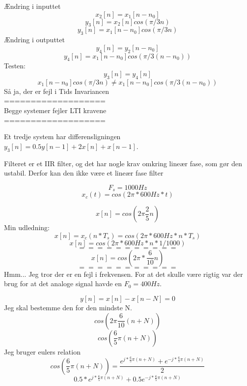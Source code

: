 \begin{rubrik}[Eksamenssæt2022]
\begin{eksamensOpgave}
\begin{UnderOpgave}
            Ændring i inputtet
            \[x_2[n] = x_1[n - n_0]\]
            \[y_3[n] = x_2[n]cos(\pi/3 n)\]
            \[y_3[n] = x_1[n - n_0]cos(\pi/3 n)\]
            Ændring i outputtet
            \[y_4[n] = y_2[n - n_0]\]
            \[y_4[n] = x_1[n - n_0]cos(\pi/3 (n - n_0))\]
            Testen: 
            \[y_3[n] = y_4[n]\]
            \[x_1[n - n_0]cos(\pi/3 n) \neq x_1[n - n_0]cos(\pi/3 (n - n_0))\]
            Så ja, der er fejl i Tids Invariancen\\
            ===================\\
            Begge systemer fejler LTI kravene\\
            ===================\\
        \end{UnderOpgave}
        Et tredje system har differensligningen $y_3[n] = 0.5y[n - 1] + 2x[n] + x[n - 1]$.
        \begin{UnderOpgave}
            Filteret er et IIR filter, og det har nogle krav omkring lineær fase, som gør den ustabil. 
            Derfor kan den ikke være et lineær fase filter         
        \end{UnderOpgave}
    \end{eksamensOpgave}
    \begin{eksamensOpgave}
        \[F_s = 1000Hz\]
        \[x_c(t) = cos(2\pi * 600Hz * t)\]
        \begin{UnderOpgave}
            \[x[n] = cos(2\pi \frac{2}{5} n)\]
            Min udledning: 
            \[x[n] = x_c(n * T_s) = cos(2\pi * 600Hz * n * T_s)\]
            \[x[n] = cos(2\pi * 600Hz * n * 1/1000)\]
            \[===========\]
            \[x[n] = cos(2\pi * \frac{6}{10} n )\]
            \[===========\]
            Hmm... Jeg tror der er en fejl i frekvensen. For at det skulle være rigtig var der brug for at det analoge signal havde en $F_0 = 400Hz$.
        \end{UnderOpgave}
        \begin{UnderOpgave}
            \[y[n] = x[n] - x[n - N] = 0\]
            Jeg skal bestemme den for den mindste N. 
            \[cos(2\pi \frac{6}{10} (n + N))\]
            \[cos(\frac{6}{5}\pi (n + N))\] 
            Jeg bruger eulers relation
            \[cos(\frac{6}{5}\pi (n + N)) = \frac{e^{j * \frac{6}{5}\pi (n + N)} + e^{- j * \frac{6}{5}\pi (n + N)}}{2}\]
            \[0.5 * e^{j * \frac{6}{5}\pi (n + N)} + 0.5 e^{- j * \frac{6}{5}\pi (n + N)}\]

\end{UnderOpgave}
\end{eksamensOpgave}
\end{rubrik}
